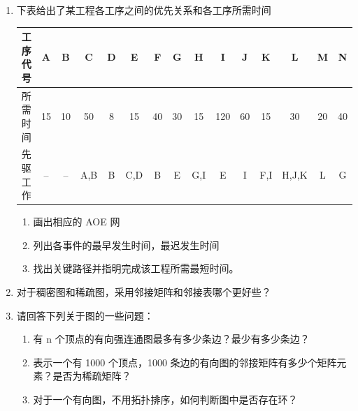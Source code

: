 \documentclass[12pt, a4paper]{article}
\begin{document}
\begin{enumerate}
	\item 下表给出了某工程各工序之间的优先关系和各工序所需时间
	      \begin{center}
		      \begin{tabular}{|c|c|c|c|c|c|c|c|c|c|c|c|c|c|c|}
			      \hline
			      工序代号 & A  & B  & C   & D & E   & F  & G  & H   & I   & J  & K   & L     & M  & N  \\ \hline
			      所需时间 & 15 & 10 & 50  & 8 & 15  & 40 & 30 & 15  & 120 & 60 & 15  & 30    & 20 & 40 \\ \hline
			      先驱工作 & -- & -- & A,B & B & C,D & B  & E  & G,I & E   & I  & F,I & H,J,K & L  & G  \\ \hline
		      \end{tabular}
	      \end{center}
	      \begin{enumerate}
		      \item 画出相应的 AOE 网
		      \item 列出各事件的最早发生时间，最迟发生时间
		      \item 找出关键路径并指明完成该工程所需最短时间。
	      \end{enumerate}

	\item 对于稠密图和稀疏图，采用邻接矩阵和邻接表哪个更好些？

	\item 请回答下列关于图的一些问题：
	      \begin{enumerate}
		      \item 有 n 个顶点的有向强连通图最多有多少条边？最少有多少条边？
		      \item 表示一个有 1000 个顶点，1000 条边的有向图的邻接矩阵有多少个矩阵元素？是否为稀疏矩阵？
		      \item 对于一个有向图，不用拓扑排序，如何判断图中是否存在环？
	      \end{enumerate}
\end{enumerate}
\end{document}
